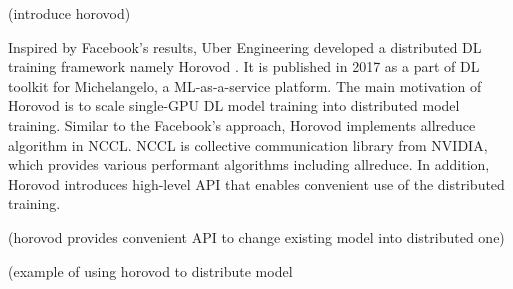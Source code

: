 (introduce horovod)

Inspired by Facebook's results, Uber Engineering developed a distributed DL
training framework namely Horovod \cite{sergeev2018horovod}. It is published in
2017 as a part of DL toolkit for Michelangelo, a ML-as-a-service platform.
The main motivation of Horovod is to scale single-GPU DL model training
into distributed model training. Similar to the Facebook's approach,
Horovod implements allreduce algorithm in NCCL. NCCL is collective communication
library from NVIDIA, which provides various performant algorithms including
allreduce. In addition, Horovod introduces high-level API that enables
convenient use of the distributed training.  

(horovod provides convenient API to change existing model into distributed one)

(example of using horovod to distribute model
